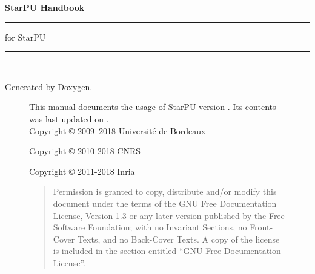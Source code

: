 %
%
%
%
%

\setlength{\parskip}{0pt}
\begin{titlepage}
\vspace*{4cm}
{\Huge \textbf{StarPU Handbook}}\\
\rule{\textwidth}{1.5mm}
\begin{flushright}
{\Large for StarPU \STARPUVERSION}
\end{flushright}
\rule{\textwidth}{1mm}
~\\
\vspace*{15cm}
\begin{flushright}
Generated by Doxygen.
\end{flushright}
\end{titlepage}

\begin{figure}[p]
This manual documents the usage of StarPU version \STARPUVERSION. Its contents
was last updated on \STARPUUPDATED.\\

Copyright © 2009–2018 Université de Bordeaux

Copyright © 2010-2018 CNRS

Copyright © 2011-2018 Inria

\medskip

\begin{quote}
Permission is granted to copy, distribute and/or modify this document
under the terms of the GNU Free Documentation License, Version 1.3 or
any later version published by the Free Software Foundation; with no
Invariant Sections, no Front-Cover Texts, and no Back-Cover Texts. A
copy of the license is included in the section entitled “GNU Free
Documentation License”.
\end{quote}
\end{figure}

